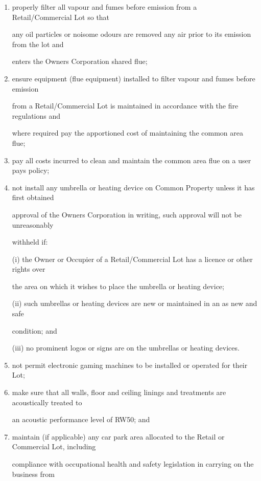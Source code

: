 \documentclass{article}
\begin{document}
\begin{enumerate}[label=\arabic*.]
\begin{enumerate}[label=\arabic{enumi}.\arabic*.]
\begin{enumerate}[label=(\arabic*)]
\begin{enumerate}[label=(\alph*)]
\item  properly filter all vapour and fumes before emission from a Retail/Commercial Lot so that 

any oil particles or noisome odours are removed any air prior to its emission from the lot and 

enters the Owners Corporation shared flue; 

\item  ensure equipment (flue equipment) installed to filter vapour and fumes before emission 

from a Retail/Commercial Lot is maintained in accordance with the fire regulations and 

where required pay the apportioned cost of maintaining the common area flue; 

\item  pay all costs incurred to clean and maintain the common area flue on a user pays policy; 

\item  not install any umbrella or heating device on Common Property unless it has first obtained 

approval of the Owners Corporation in writing, such approval will not be unreasonably 

withheld if: 

(i) the Owner or Occupier of a Retail/Commercial Lot has a licence or other rights over 

the area on which it wishes to place the umbrella or heating device; 

(ii) such umbrellas or heating devices are new or maintained in an as new and safe 

condition; and 

(iii) no prominent logos or signs are on the umbrellas or heating devices. 

\item  not permit electronic gaming machines to be installed or operated for their Lot; 

\item  make sure that all walls, floor and ceiling linings and treatments are acoustically treated to 

an acoustic performance level of RW50; and 

\item  maintain (if applicable) any car park area allocated to the Retail or Commercial Lot, including 

compliance with occupational health and safety legislation in carrying on the business from 


\end{enumerate}
\end{enumerate}
\end{enumerate}
\end{enumerate}
\end{document}
